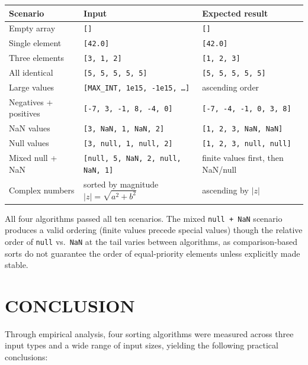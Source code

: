 \documentclass[12pt]{article}
\begin{document}
\begin{center}
\renewcommand{\arraystretch}{1.4}
\begin{tabular}{lll}
\toprule
\textbf{Scenario} & \textbf{Input} & \textbf{Expected result} \\
\midrule
Empty array            & \texttt{[]}                              & \texttt{[]} \\
Single element         & \texttt{[42.0]}                          & \texttt{[42.0]} \\
Three elements         & \texttt{[3, 1, 2]}                       & \texttt{[1, 2, 3]} \\
All identical          & \texttt{[5, 5, 5, 5, 5]}                 & \texttt{[5, 5, 5, 5, 5]} \\
Large values           & \texttt{[MAX\_INT, 1e15, -1e15, \ldots]} & ascending order \\
Negatives + positives  & \texttt{[-7, 3, -1, 8, -4, 0]}           & \texttt{[-7, -4, -1, 0, 3, 8]} \\
NaN values             & \texttt{[3, NaN, 1, NaN, 2]}             & \texttt{[1, 2, 3, NaN, NaN]} \\
Null values            & \texttt{[3, null, 1, null, 2]}           & \texttt{[1, 2, 3, null, null]} \\
Mixed null + NaN       & \texttt{[null, 5, NaN, 2, null, NaN, 1]} & finite values first, then NaN/null \\
Complex numbers        & sorted by magnitude $|z| = \sqrt{a^2+b^2}$ & ascending by $|z|$ \\
\bottomrule
\end{tabular}
\end{center}

All four algorithms passed all ten scenarios. The mixed \texttt{null + NaN} scenario produces
a valid ordering (finite values precede special values) though the relative order of
\texttt{null} vs.\ \texttt{NaN} at the tail varies between algorithms, as comparison-based
sorts do not guarantee the order of equal-priority elements unless explicitly made stable.

\section*{CONCLUSION}

\hspace{0.8cm} Through empirical analysis, four sorting algorithms were measured across three
input types and a wide range of input sizes, yielding the following practical conclusions:
\end{document}
